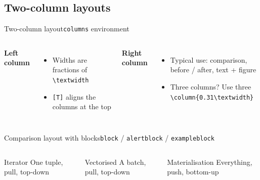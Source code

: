 \subsection{Two-column layouts}
\begin{frame}{Two-column layout}{\texttt{columns} environment}
  \begin{columns}[T]
      \textbf{Left column}
      \begin{itemize}
        \item Widths are fractions of \texttt{\textbackslash textwidth}
        \item \texttt{[T]} aligns the columns at the top
      \end{itemize}
      \textbf{Right column}
      \begin{itemize}
        \item Typical use: comparison, \\ before / after, text + figure
        \item Three columns? Use three \texttt{\textbackslash column\{0.31\textbackslash textwidth\}}
      \end{itemize}
  \end{columns}
\end{frame}

\begin{frame}{Comparison layout with blocks}{\texttt{block} / \texttt{alertblock} / \texttt{exampleblock}}
  \begin{columns}[T]
      \begin{block}{Iterator}
        One tuple, pull, top-down
      \end{block}
      \begin{exampleblock}{Vectorised}
        A batch, pull, top-down
      \end{exampleblock}
      \begin{alertblock}{Materialisation}
        Everything, push, bottom-up
      \end{alertblock}
  \end{columns}
\end{frame}


